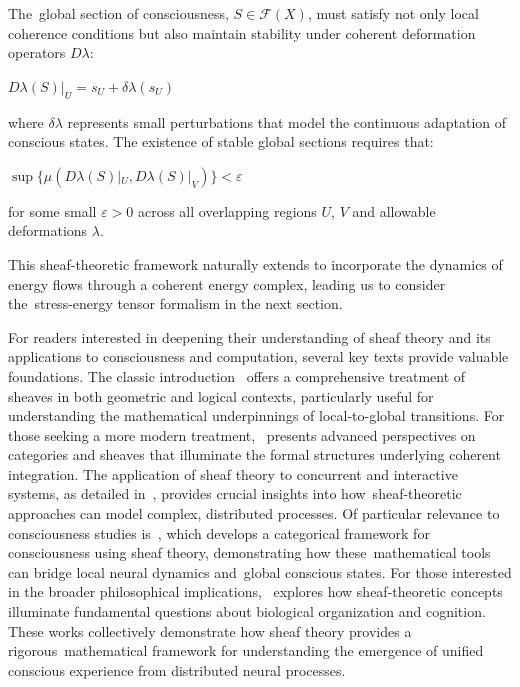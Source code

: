 The~global section of consciousness, $S \in \mathcal{F}(X)$, must satisfy not only local coherence conditions but also maintain stability under coherent deformation operators $D\lambda$:

$D\lambda(S)|_U = s_U + \delta\lambda(s_U)$

where $\delta\lambda$ represents small perturbations that model the continuous adaptation of conscious states. The existence of stable global sections requires that:

$\sup\{\mu(D\lambda(S)|_U, D\lambda(S)|_V)\} < \varepsilon$

for some small $\varepsilon > 0$ across all overlapping regions $U$, $V$ and allowable deformations $\lambda$.

This sheaf-theoretic framework naturally extends to incorporate the dynamics of energy flows through a coherent energy complex, leading us to consider the~stress-energy tensor formalism in the next section.

For readers interested in deepening their understanding of sheaf theory and its applications to consciousness and computation, several key texts provide valuable foundations. The classic introduction~\cite{MacLane1992} offers a comprehensive treatment of sheaves in both geometric and logical contexts, particularly useful for understanding the mathematical underpinnings of local-to-global transitions. For those seeking a more modern treatment,~\cite{Kashiwara2005} presents advanced perspectives on categories and sheaves that illuminate the formal structures underlying coherent integration. The application of sheaf theory to concurrent and interactive systems, as detailed in~\cite{Goguen1992}, provides crucial insights into how~sheaf-theoretic approaches can model complex, distributed processes. Of particular relevance to consciousness studies is~\cite{Rushworth2018}, which develops a categorical framework for consciousness using sheaf theory, demonstrating how these~mathematical tools can bridge local neural dynamics and~global conscious states. For those interested in the broader philosophical implications,~\cite{Rosen1991} explores how sheaf-theoretic concepts illuminate fundamental questions about biological organization and cognition. These works collectively demonstrate how sheaf theory provides a rigorous~mathematical framework for understanding the emergence of unified conscious experience from distributed neural processes.


